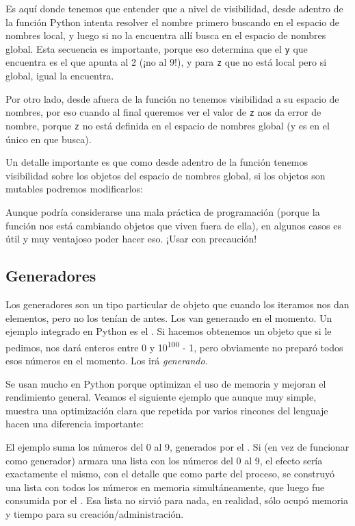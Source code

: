 Es aquí donde tenemos que entender que a nivel de visibilidad, desde adentro de la función Python intenta resolver el nombre primero buscando en el espacio de nombres local, y luego si no la encuentra allí busca en el espacio de nombres global. Esta secuencia es importante, porque eso determina que el \verb|y| que encuentra es el que apunta al 2 (¡no al 9!), y para \verb|z| que no está local pero si global, igual la encuentra.

Por otro lado, desde afuera de la función no tenemos visibilidad a su espacio de nombres, por eso cuando al final queremos ver el valor de \verb|z| nos da error de nombre, porque \verb|z| no está definida en el espacio de nombres global (y es en el único en que busca).

Un detalle importante es que como desde adentro de la función tenemos visibilidad sobre los objetos del espacio de nombres global, si los objetos son mutables podremos modificarlos:


Aunque podría considerarse una mala práctica de programación (porque la función nos está cambiando objetos que viven fuera de ella), en algunos casos es útil y muy ventajoso poder hacer eso. ¡Usar con precaución!


\subsection{Generadores}

Los generadores son un tipo particular de objeto que cuando los iteramos nos dan elementos, pero no los tenían de antes. Los van generando en el momento. Un ejemplo integrado en Python es el . Si hacemos  obtenemos un objeto que si le pedimos, nos dará enteros entre 0 y 10\textsuperscript{100} - 1, pero obviamente no preparó todos esos números en el momento. Los irá \textit{generando}.

Se usan mucho en Python porque optimizan el uso de memoria y mejoran el rendimiento general. Veamos el siguiente ejemplo que aunque muy simple, muestra una optimización clara que repetida por varios rincones del lenguaje hacen una diferencia importante:


El ejemplo suma los números del 0 al 9, generados por el . Si  (en vez de funcionar como generador) armara una lista con los números del 0 al 9, el efecto sería exactamente el mismo, con el detalle que como parte del proceso, se construyó una lista con todos los números en memoria simultáneamente, que luego fue consumida por el . Esa lista no sirvió para nada, en realidad, sólo ocupó memoria y tiempo para su creación/administración.

